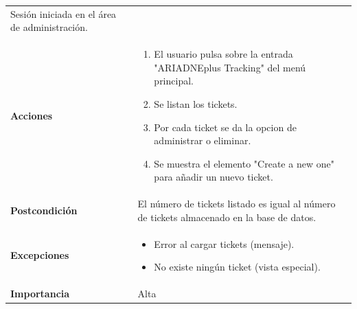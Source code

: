\documentclass[
]{article}
\providecommand{\tightlist}{%
  \setlength{\itemsep}{0pt}\setlength{\parskip}{0pt}}
\begin{document}
\begin{longtable}[]{@{}ll@{}}
\begin{minipage}[t]{0.74\columnwidth}
Sesión iniciada en el área de administración.\strut
\end{minipage}\tabularnewline
\begin{minipage}[t]{0.20\columnwidth}\raggedright
\textbf{Acciones}\strut
\end{minipage} & \begin{minipage}[t]{0.74\columnwidth}\raggedright
\begin{enumerate}
\def\labelenumi{\arabic{enumi}.}
\tightlist
\item
  El usuario pulsa sobre la entrada "ARIADNEplus Tracking" del menú
  principal.
\item
  Se listan los tickets.
\item
  Por cada ticket se da la opcion de administrar o eliminar.
\item
  Se muestra el elemento "Create a new one" para añadir un nuevo ticket.
\end{enumerate}\strut
\end{minipage}\tabularnewline
\begin{minipage}[t]{0.20\columnwidth}\raggedright
\textbf{Postcondición}\strut
\end{minipage} & \begin{minipage}[t]{0.74\columnwidth}\raggedright
El número de tickets listado es igual al número de tickets almacenado en
la base de datos.\strut
\end{minipage}\tabularnewline
\begin{minipage}[t]{0.20\columnwidth}\raggedright
\textbf{Excepciones}\strut
\end{minipage} & \begin{minipage}[t]{0.74\columnwidth}\raggedright
\begin{itemize}
\tightlist
\item
  Error al cargar tickets (mensaje).
\item
  No existe ningún ticket (vista especial).
\end{itemize}\strut
\end{minipage}\tabularnewline
\begin{minipage}[t]{0.20\columnwidth}\raggedright
\textbf{Importancia}\strut
\end{minipage} & \begin{minipage}[t]{0.74\columnwidth}\raggedright
Alta\strut
\end{minipage}\tabularnewline
\bottomrule
\end{longtable}
\end{document}

